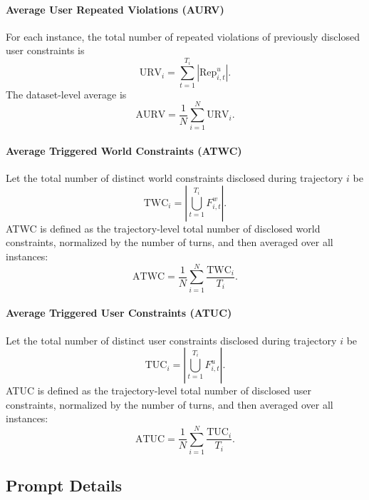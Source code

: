 \documentclass{llmxive}
\begin{document}
\paragraph{Average User Repeated Violations (AURV)}
For each instance, the total number of repeated violations of previously disclosed user constraints is
\begin{equation}
\mathrm{URV}_i
=
\sum_{t=1}^{T_i} \left| \mathrm{Rep}_{i,t}^u \right|.
\end{equation}
The dataset-level average is
\begin{equation}
\mathrm{AURV}
=
\frac{1}{N}\sum_{i=1}^{N} \mathrm{URV}_i.
\end{equation}

\paragraph{Average Triggered World Constraints (ATWC)}
Let the total number of distinct world constraints disclosed during trajectory $i$ be
\begin{equation}
\mathrm{TWC}_i
=
\left|
\bigcup_{t=1}^{T_i} F_{i,t}^w
\right|.
\end{equation}
ATWC is defined as the trajectory-level total number of disclosed world constraints,
normalized by the number of turns, and then averaged over all instances:
\begin{equation}
\mathrm{ATWC}
=
\frac{1}{N}\sum_{i=1}^{N}
\frac{\mathrm{TWC}_i}{T_i}.
\end{equation}

\paragraph{Average Triggered User Constraints (ATUC)}
Let the total number of distinct user constraints disclosed during trajectory $i$ be
\begin{equation}
\mathrm{TUC}_i
=
\left|
\bigcup_{t=1}^{T_i} F_{i,t}^u
\right|.
\end{equation}
ATUC is defined as the trajectory-level total number of disclosed user constraints,
normalized by the number of turns, and then averaged over all instances:
\begin{equation}
\mathrm{ATUC}
=
\frac{1}{N}\sum_{i=1}^{N}
\frac{\mathrm{TUC}_i}{T_i}.
\end{equation}


\subsection{Prompt Details}
\label{app:prompt-details}
\end{document}
